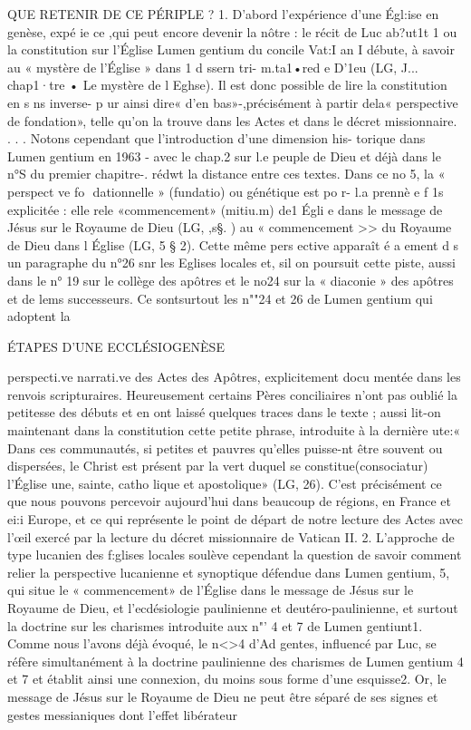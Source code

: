 QUE RETENIR DE CE PÉRIPLE ?
1.	D'abord l'expérience d'une Égl:ise en genèse, expé ie ce ,qui peut encore devenir la nôtre : le récit de Luc ab?ut1t 1 ou la constitution sur l'Église Lumen gentium du concile Vat:I an I débute, à savoir au « mystère de l'Église » dans 1  d ssern tri-
m.ta1•red e D'1eu (LG, J... chap1·tre • Le mystère de l Eghse). Il est
donc possible de lire la constitution en s ns inverse-  p ur ainsi dire« d'en bas»-,précisément à partir dela« perspective de fondation», telle qu'on la trouve dans les Actes et dans le
décret missionnaire.	.  . . Notons cependant que l'introduction d'une dimension his-
torique dans Lumen gentium en 1963 - avec le chap.2 sur l.e peuple de Dieu et déjà dans le n°S du premier chapitre-. rédwt la distance entre ces textes. Dans ce no 5, la « perspect ve fo ­ dationnelle » (fundatio) ou génétique est po r- l.a prennè e f 1s explicitée : elle re\ie le «commencement» (mitiu.m) de1 Égli e
dans le message de Jésus sur le Royaume de Dieu (LG, ,s§.  )
au «	commencement >> du	Royaume de Dieu dans l Église (LG, 5 § 2). Cette même pers ective apparaît é a ement d s un paragraphe du n°26 snr les Eglises locales et, sil on poursuit cette piste, aussi dans le n° 19 sur le collège des apôtres et le no24 sur la « diaconie » des apôtres et de lems successeurs. Ce sontsurtout les n""24 et 26 de Lumen gentium qui adoptent la
 
ÉTAPES D'UNE ECCLÉSIOGENÈSE

perspecti.ve narrati.ve des Actes des Apôtres, explicitement docu­ mentée dans les renvois scripturaires. Heureusement certains Pères conciliaires n'ont pas oublié la petitesse des débuts et en ont laissé quelques traces dans le texte ; aussi lit-on maintenant dans la constitution cette petite phrase, introduite à la dernière ute:« Dans ces communautés, si petites et pauvres qu'elles puisse-nt être souvent ou dispersées, le Christ est présent par la vert duquel se constitue(consociatur) l'Église une, sainte, catho­ lique et apostolique» (LG, 26). C'est précisément ce que nous pouvons percevoir aujourd'hui dans beaucoup de régions, en France et ei:i Europe, et ce qui représente le point de départ de
notre lecture des Actes avec l'œil exercé par la lecture du décret missionnaire de Vatican II.
2.	L'approche de type lucanien des f:glises locales soulève cependant la question de savoir comment relier la perspective lucanienne et synoptique défendue dans Lumen gentium, 5, qui situe le « commencement» de l'Église dans le message de Jésus sur le Royaume de Dieu, et l'ecdésiologie paulinienne et deutéro-paulinienne, et surtout la doctrine sur les charismes introduite aux n"' 4 et 7 de Lumen gentiunt1. Comme nous l'avons déjà évoqué, le n<>4 d'Ad gentes, influencé par Luc, se réfère simultanément à la doctrine paulinienne des charismes de
Lumen gentium 4 et 7 et établit ainsi une connexion, du moins sous forme d'une esquisse2.
Or, le message de Jésus sur le Royaume de Dieu ne peut être séparé de ses signes et gestes messianiques dont l'effet libérateur

